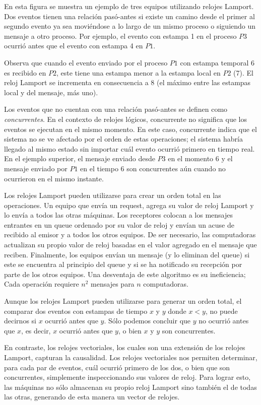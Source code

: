 \documentclass[12pt]{article}
\begin{document}
En esta figura se muestra un ejemplo de tres equipos utilizando relojes Lamport.
Dos eventos tienen una relación pasó-antes si existe un camino desde el primer al segundo evento ya sea moviéndose a lo largo de un mismo proceso o siguiendo un mensaje a otro proceso.
Por ejemplo, el evento con estampa 1 en el proceso $P3$ ocurrió antes que el evento con estampa 4 en $P1$.

Observa que cuando el evento enviado por el proceso $P1$ con estampa temporal 6 es recibido en $P2$,
este tiene una estampa menor a la estampa local en $P2$ (7).
El reloj Lamport se incrementa en consecuencia a 8 (el máximo entre las estampas local y del mensaje, más uno).

Los eventos que no cuentan con una relación pasó-antes se definen como \emph{concurrentes}.
En el contexto de relojes lógicos,
concurrente no significa que los eventos se ejecutan en el mismo momento.
En este caso, concurrente indica que el sistema no se ve afectado por el orden de estas operaciones;
el sistema habría llegado al mismo estado sin importar cuál evento ocurrió primero en tiempo real.
En el ejemplo superior, el mensaje enviado desde $P3$ en el momento 6 y el mensaje enviado por $P1$ en el tiempo 6 son concurrentes aún cuando no ocurrieron en el mismo instante.

Los relojes Lamport pueden utilizarse para crear un orden total en las operaciones.
Un equipo que envía un request,
agrega su valor de reloj Lamport y lo envía a todos las otras máquinas.
Los receptores colocan a los mensajes entrantes en un queue ordenado por su valor de reloj y envían un acuse de recibido al emisor y a todos los otros equipos.
De ser necesario,
las computadoras actualizan su propio valor de reloj basadas en el valor agregado en el mensaje que reciben.
Finalmente,
los equipos envían un mensaje (y lo eliminan del queue) si este se encuentra al principio del queue y si se ha notificado su recepción por parte de los otros equipos.
Una desventaja de este algoritmo es su ineficiencia;
Cada operación requiere $n^2$ mensajes para $n$ computadoras.

Aunque los relojes Lamport pueden utilizarse para generar un orden total,
el comparar dos eventos con estampas de tiempo $x$ y $y$ donde $x < y$,
no puede decirnos si $x$ ocurrió antes que $y$.
Sólo podemos concluir que $y$ no ocurrió antes que $x$,
es decir,
$x$ ocurrió antes que $y$,
o bien $x$ y $y$ son concurrentes.

En contraste, los relojes vectoriales,
los cuales son una extensión de los relojes Lamport,
capturan la causalidad.
Los relojes vectoriales nos permiten determinar,
para cada par de eventos,
cuál ocurrió primero de los dos,
o bien que son concurrentes,
simplemente inspeccionando sus valores de reloj.
Para lograr esto,
las máquinas no sólo almacenan su propio reloj Lamport
sino también el de todas las otras,
generando de esta manera un vector de relojes.
\end{document}
